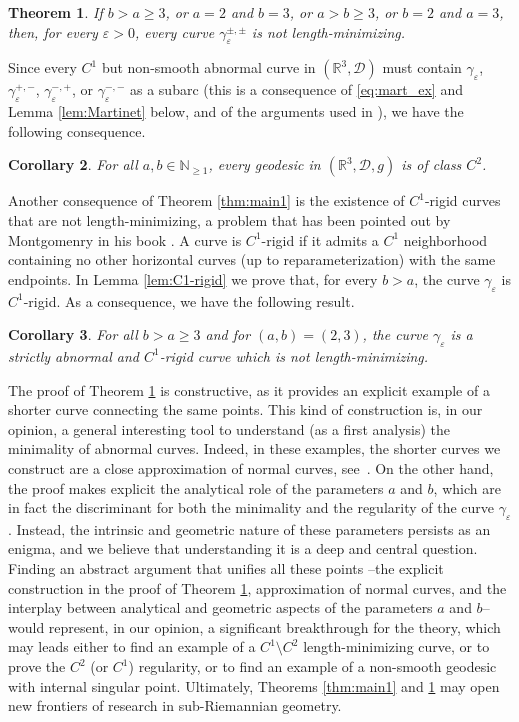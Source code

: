 \documentclass[12pt]{amsart}
\theoremstyle{plain}
\newtheorem {theorem}{Theorem}[section]
\newtheorem {corollary} [theorem]{Corollary}
\theoremstyle{definition}
\theoremstyle{remark}
\numberwithin{equation}{section}
\newcommand{\R}{\mathbb{R}}
\newcommand{\N}{\mathbb{N}}
\newcommand{\D}{\mathcal{D}}
\newcommand{\<}{\langle}
\renewcommand{\>}{\rangle}
\newcommand{\e}{\varepsilon}
\newcommand{\0}{\theta}
\newcommand{\g}{\gamma}
\newcommand{\1}{{-1}}
\renewcommand{\=}{\coloneqq}
\renewcommand{\.}{\dots}
\renewcommand{\-}{\cdot}
\renewcommand{\:}{\,:\,}
\theoremstyle{definition}
\begin{document}
\begin{theorem}
	\label{thm:main2}
	If $b>a\geq3$, or $a=2$ and $b=3$, or $a>b\geq3$, or $b=2$ and $a=3$, then, for every $\e>0$, every curve $\g_\e^{\pm,\pm}$ is not length-minimizing.
\end{theorem}

Since every $C^1$ but non-smooth abnormal curve in $(\R^3,\D)$ must contain $\g_\e$, $\g_\e^{+,-}$, $\g_\e^{-,+}$, or $\g_\e^{-,-}$ as a subarc (this is a consequence of \eqref{eq:mart_ex} and Lemma \ref{lem:Martinet} below, and of the arguments used in \cite[Section 4]{LPS24}), we have the following consequence.

\begin{corollary}
	For all $a,b\in\N_{\geq1}$, every geodesic in $(\R^3,\D,g)$ is of class $C^2$.
\end{corollary}

{ Another consequence of Theorem \ref{thm:main1} is the existence of $C^1$-rigid curves that are not length-minimizing, a problem that has been pointed out by Montgomenry in his book \cite[Chapter 3]{Mon02}. A curve is $C^1$-rigid if it admits a $C^1$ neighborhood containing no other horizontal curves (up to reparameterization) with the same endpoints. In Lemma \ref{lem:C1-rigid} we prove that, for every $b>a$, the curve $\g_\e$ is $C^1$-rigid. As a consequence, we have the following result.

\begin{corollary}
	\label{cor:C1rigid-nonmin}
	For all $b>a\geq3$ and for $(a,b)=(2,3)$, the curve $\g_\e$ is a strictly abnormal and $C^1$-rigid curve which is not length-minimizing.
\end{corollary}

}

The proof of Theorem \ref{thm:main2} is constructive, as it provides an explicit example of a shorter curve connecting the same points. This kind of construction is, in our opinion, a general interesting tool to understand (as a first analysis) the minimality of abnormal curves. Indeed, in these examples, the shorter curves we construct are a close approximation of normal curves, see~\cite[Proposition 2.2]{CJMRSSS24}. On the other hand, the proof makes explicit the analytical role of the parameters $a$ and $b$, which are in fact the discriminant for both the minimality and the regularity of the curve $\g_\e$. Instead, the intrinsic and geometric nature of these parameters persists as an enigma, and we believe that understanding it is a deep and central question. Finding an abstract argument that unifies all these points --the explicit construction in the proof of Theorem \ref{thm:main2}, approximation of normal curves, and the interplay between analytical and geometric aspects of the parameters $a$ and $b$-- would represent, in our opinion, a significant breakthrough for the theory, which may leads either to find an example of a $C^1\setminus C^2$ length-minimizing curve, or to prove the $C^2$ (or $C^1$) regularity, or to find an example of a non-smooth geodesic with internal singular point. Ultimately, Theorems \ref{thm:main1} and \ref{thm:main2} may open new frontiers of research in sub-Riemannian geometry.
	
\end{document}
